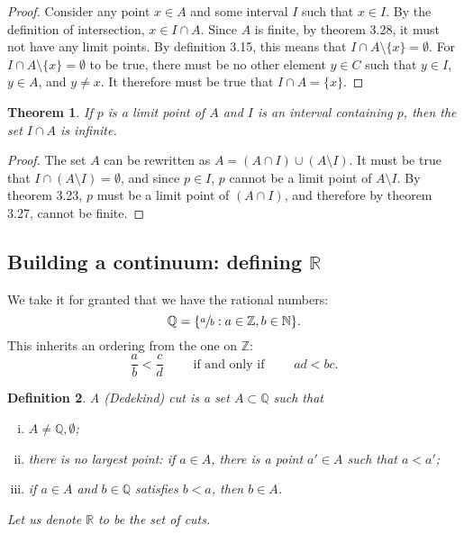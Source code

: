\documentclass{amsart}
\newtheorem{theorem}{Theorem}
\newtheorem{definition}[theorem]{Definition}
\newcommand{\N}{\mathbb N}
\newcommand{\Q}{\mathbb Q}
\newcommand{\R}{\mathbb R}
\newcommand{\Z}{\mathbb Z}
\newcommand{\1}{\mathds{1}}
\def \R {{\mathbb {R}}}
\def \N {{\mathbb {N}}}
\def \Z {{\mathbb {Z}}}
\numberwithin{equation}{section}
\numberwithin{theorem}{section}
\begin{document}
\begin{proof}
	Consider any point $x\in A$ and some interval $I$ such that $x\in I$. By the definition of intersection, $x\in I\cap A$. Since $A$ is finite, by theorem 3.28, it must not have any limit points. By definition 3.15, this means that $I\cap A\setminus\{x\} =\emptyset$. For $I\cap A\setminus\{x\} =\emptyset$ to be true, there must be no other element $y\in C$ such that $y\in I$, $y\in A$, and $y\not=x$. It therefore must be true that $I\cap A = \{x\}$.
\end{proof}

\begin{theorem}  If $p$ is a limit point of $A$ and $I$ is an interval containing $p$, then the set $I \cap A$ is infinite.
\end{theorem}

\begin{proof}
	The set $A$ can be rewritten as $A = (A\cap I) \cup (A\setminus I)$. It must be true that $I\cap (A\setminus I) = \emptyset$, and since $p\in I$, $p$ cannot be a limit point of $A\setminus I$. By theorem 3.23, $p$ must be a limit point of $(A\cap I)$, and therefore by theorem 3.27, cannot be finite.
\end{proof}

\subsection{Building a continuum: defining $\R$}

We take it for granted that we have the rational numbers:
\[
\Q = \{ \sfrac{a}{b}: a \in \Z, b \in \N\}.
\]
This inherits an ordering from the one on $\Z$:
\[
\frac{a}{b} < \frac{c}{d}
\qquad\text{ if and only if }\qquad
ad < bc.
\]
\begin{definition}
	A (Dedekind) cut is a set $A \subset \Q$ such that
	\begin{enumerate}[(i)]
		
		\item $A \neq \Q,\emptyset$;
		
		\item there is no largest point: if $a \in A$, there is a point $a' \in A$ such that $a < a'$;
		
		\item if $a\in A$ and $b \in \Q$ satisfies $b<a$, then $b \in A$.
		
	\end{enumerate}
	Let us denote $\R$ to be the set of cuts.
\end{definition}
\end{document}
